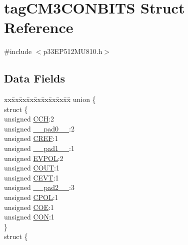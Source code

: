 \hypertarget{structtag_c_m3_c_o_n_b_i_t_s}{}\section{tag\+C\+M3\+C\+O\+N\+B\+I\+TS Struct Reference}
\label{structtag_c_m3_c_o_n_b_i_t_s}


{\ttfamily \#include $<$p33\+E\+P512\+M\+U810.\+h$>$}

\subsection*{Data Fields}
\begin{DoxyCompactItemize}
\item 
\begin{tabbing}
xx\=xx\=xx\=xx\=xx\=xx\=xx\=xx\=xx\=\kill
union \{\\
\>struct \{\\
\>\>unsigned \hyperlink{structtag_c_m3_c_o_n_b_i_t_s_af6a2b157b0f71dea8f43c91f28d471fa}{CCH}:2\\
\>\>unsigned \hyperlink{structtag_c_m3_c_o_n_b_i_t_s_adf71f3d8410c1f1dbbc96680a92c49af}{\_\_pad0\_\_}:2\\
\>\>unsigned \hyperlink{structtag_c_m3_c_o_n_b_i_t_s_a9048d78086e7f5418dbc9fecb8919d03}{CREF}:1\\
\>\>unsigned \hyperlink{structtag_c_m3_c_o_n_b_i_t_s_acaf2d0924a107ec6e8d2e31febaf66f9}{\_\_pad1\_\_}:1\\
\>\>unsigned \hyperlink{structtag_c_m3_c_o_n_b_i_t_s_a22ccc87578ee3feb3e930e91cb3aabde}{EVPOL}:2\\
\>\>unsigned \hyperlink{structtag_c_m3_c_o_n_b_i_t_s_acc4589f929da98d8dbb0e6471091a261}{COUT}:1\\
\>\>unsigned \hyperlink{structtag_c_m3_c_o_n_b_i_t_s_aa7004514fee8eae1195cde3df03f2325}{CEVT}:1\\
\>\>unsigned \hyperlink{structtag_c_m3_c_o_n_b_i_t_s_a4d97cc5f7d51d22fc2bf3eab35c9cb7f}{\_\_pad2\_\_}:3\\
\>\>unsigned \hyperlink{structtag_c_m3_c_o_n_b_i_t_s_a04811054048ff377eded5449c6bdf534}{CPOL}:1\\
\>\>unsigned \hyperlink{structtag_c_m3_c_o_n_b_i_t_s_ad11255870fadb4e9c1faac4645267702}{COE}:1\\
\>\>unsigned \hyperlink{structtag_c_m3_c_o_n_b_i_t_s_a92ce9acc6bbe01ff104c2c8f55101852}{CON}:1\\
\>\} \\
\>struct \{\\

\end{tabbing}
\end{DoxyCompactItemize}
